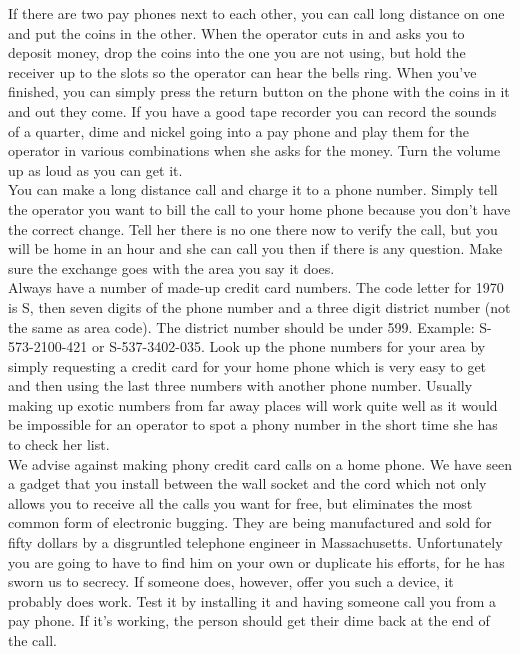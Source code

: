 \documentclass[11pt,twoside,a4paper]{book}
\begin{document}
If there are two pay phones next to each other, you can call long distance on one and put the coins in the other. When the operator cuts in and asks you to deposit money, drop the coins into the one you are not using, but hold the receiver up to the slots so the operator can hear the bells ring. When you've finished, you can simply press the return button on the phone with the coins in it and out they come. If you have a good tape recorder you can record the sounds of a quarter, dime and nickel going into a pay phone and play them for the operator in various combinations when she asks for the money. Turn the volume up as loud as you can get it.~\\

You can make a long distance call and charge it to a phone number. Simply tell the operator you want to bill the call to your home phone because you don't have the correct change. Tell her there is no one there now to verify the call, but you will be home in an hour and she can call you then if there is any question. Make sure the exchange goes with the area you say it does.~\\

Always have a number of made-up credit card numbers. The code letter for 1970 is S, then seven digits of the phone number and a three digit district number (not the same as area code). The district number should be under 599. Example: S-573-2100-421 or S-537-3402-035. Look up the phone numbers for your area by simply requesting a credit card for your home phone which is very easy to get and then using the last three numbers with another phone number. Usually making up exotic numbers from far away places will work quite well as it would be impossible for an operator to spot a phony number in the short time she has to check her list.~\\

We advise against making phony credit card calls on a home phone. We have seen a gadget that you install between the wall socket and the cord which not only allows you to receive all the calls you want for free, but eliminates the most common form of electronic bugging. They are being manufactured and sold for fifty dollars by a disgruntled telephone engineer in Massachusetts. Unfortunately you are going to have to find him on your own or duplicate his efforts, for he has sworn us to secrecy. If someone does, however, offer you such a device, it probably does work. Test it by installing it and having someone call you from a pay phone. If it's working, the person should get their dime back at the end of the call.~\\
\end{document}
